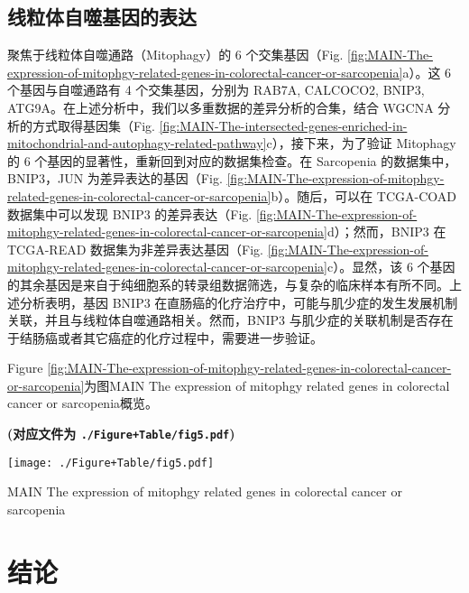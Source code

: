 \documentclass[
]{article}
\begin{document}
\hypertarget{ux7ebfux7c92ux4f53ux81eaux566cux57faux56e0ux7684ux8868ux8fbe}{%
\subsection{线粒体自噬基因的表达}\label{ux7ebfux7c92ux4f53ux81eaux566cux57faux56e0ux7684ux8868ux8fbe}}

聚焦于线粒体自噬通路（Mitophagy）的 6 个交集基因（Fig. \ref{fig:MAIN-The-expression-of-mitophgy-related-genes-in-colorectal-cancer-or-sarcopenia}a）。这 6 个基因与自噬通路有 4 个交集基因，分别为 RAB7A, CALCOCO2, BNIP3, ATG9A。在上述分析中，我们以多重数据的差异分析的合集，结合 WGCNA 分析的方式取得基因集（Fig. \ref{fig:MAIN-The-intersected-genes-enriched-in-mitochondrial-and-autophagy-related-pathway}c），接下来，为了验证 Mitophagy 的 6 个基因的显著性，重新回到对应的数据集检查。在 Sarcopenia 的数据集中，BNIP3，JUN 为差异表达的基因（Fig. \ref{fig:MAIN-The-expression-of-mitophgy-related-genes-in-colorectal-cancer-or-sarcopenia}b）。随后，可以在 TCGA-COAD 数据集中可以发现 BNIP3 的差异表达（Fig. \ref{fig:MAIN-The-expression-of-mitophgy-related-genes-in-colorectal-cancer-or-sarcopenia}d）；然而，BNIP3 在 TCGA-READ 数据集为非差异表达基因（Fig. \ref{fig:MAIN-The-expression-of-mitophgy-related-genes-in-colorectal-cancer-or-sarcopenia}c）。显然，该 6 个基因的其余基因是来自于纯细胞系的转录组数据筛选，与复杂的临床样本有所不同。上述分析表明，基因 BNIP3 在直肠癌的化疗治疗中，可能与肌少症的发生发展机制关联，并且与线粒体自噬通路相关。然而，BNIP3 与肌少症的关联机制是否存在于结肠癌或者其它癌症的化疗过程中，需要进一步验证。

Figure \ref{fig:MAIN-The-expression-of-mitophgy-related-genes-in-colorectal-cancer-or-sarcopenia}为图MAIN The expression of mitophgy related genes in colorectal cancer or sarcopenia概览。

\textbf{(对应文件为 \texttt{./Figure+Table/fig5.pdf})}

\def\@captype{figure}
\begin{center}
\texttt{[image: ./Figure+Table/fig5.pdf]}
\caption{MAIN The expression of mitophgy related genes in colorectal cancer or sarcopenia}\label{fig:MAIN-The-expression-of-mitophgy-related-genes-in-colorectal-cancer-or-sarcopenia}
\end{center}

\hypertarget{dis}{%
\section{结论}\label{dis}}
\end{document}
